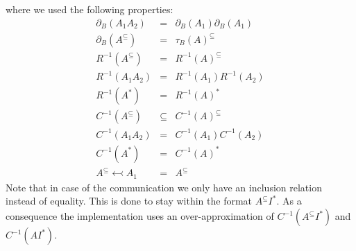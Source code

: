 \documentclass{article}
\begin{document}
where we used the following properties:%
\[
\begin{array}{lll}
\partial _{B}\left( A_{1}A_{2}\right) & = & \partial _{B}\left( A_{1}\right)
\partial _{B}\left( A_{1}\right) \\ 
\partial _{B}\left( A^{\subseteq }\right) & = & \tau _{B}(A)^{\subseteq } \\ 
R^{-1}\left( A^{\subseteq }\right) & = & R^{-1}\left( A\right) ^{\subseteq }
\\ 
R^{-1}\left( A_{1}A_{2}\right) & = & R^{-1}\left( A_{1}\right) R^{-1}\left(
A_{2}\right) \\ 
R^{-1}\left( A^{\ast }\right) & = & R^{-1}\left( A\right) ^{\ast } \\ 
C^{-1}\left( A^{\subseteq }\right) & \subseteq & C^{-1}\left( A\right)
^{\subseteq } \\ 
C^{-1}\left( A_{1}A_{2}\right) & = & C^{-1}\left( A_{1}\right) C^{-1}\left(
A_{2}\right) \\ 
C^{-1}\left( A^{\ast }\right) & = & C^{-1}\left( A\right) ^{\ast } \\ 
A^{\subseteq }\leftarrowtail A_{1} & = & A^{\subseteq }%
\end{array}%
\]%
Note that in case of the communication we only have an inclusion relation
instead of equality. This is done to stay within the format $A^{\subseteq
}I^{\ast }$. As a consequence the implementation uses an over-approximation
of $C^{-1}\left( A^{\subseteq }I^{\ast }\right) $ and $C^{-1}\left( AI^{\ast
}\right) $.
\end{document}
